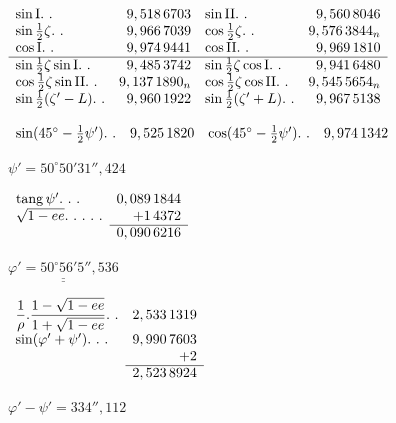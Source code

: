 \noindent\begin{minipage}[t]{.65\linewidth}\vspace{0pt}\centering
\(\begin{array}{lr@{\quad}lr}
\sin\mathrm{I}\ldotp\,\ldotp&9,518\,6703&\sin\mathrm{II}\ldotp\,\ldotp&9,560\,8046\\
\sin\tfrac12\zeta\ldotp\,\ldotp&9,966\,7039&\cos\tfrac12\zeta\ldotp\,\ldotp&9,576\,3844_n\\
\cos\mathrm{I}\ldotp\,\ldotp&9,974\,9441&\cos\mathrm{II}\ldotp\,\ldotp&9,969\,1810\\\hline
\sin\tfrac12\zeta\sin\mathrm{I}\ldotp\,\ldotp&9,485\,3742&\sin\tfrac12\zeta\cos\mathrm{I}\ldotp\,\ldotp&9,941\,6480\\
\cos\tfrac12\zeta\sin\mathrm{II}\ldotp\,\ldotp&9,137\,1890_n&\cos\tfrac12\zeta\cos\mathrm{II}\ldotp\,\ldotp&9,545\,5654_n\\
\sin\tfrac12(\zeta'-L)\ldotp\,\ldotp&9,960\,1922&\sin\tfrac12(\zeta'+L)\ldotp\,\ldotp&9,967\,5138
\end{array}\)
\par\vspace{2.7ex}
\(\begin{array}{lr@{\quad}lr}
\sin(45^\circ-\tfrac12\psi')\ldotp\,\ldotp&9,525\,1820&\cos(45^\circ-\tfrac12\psi')\ldotp\,\ldotp&9,974\,1342
\end{array}\)
\par\smallskip
\(\psi'=50^\circ50'31'',424\)
\par\smallskip
\noindent\begin{minipage}[t]{.45\linewidth}\vspace{0pt}\centering
\(\begin{array}{lr}
\operatorname{tang}\psi'\ldotp\,\ldotp\,\ldotp&0,089\,1844\\
\sqrt{1-ee}\ldotp\,\ldotp\,\ldotp\,\ldotp\,\ldotp&+1\,4372\\\cline{2-2}
&0,090\,6216
\end{array}\)
\par\vspace{3ex}
\(\underline{\underline{\varphi'=50^\circ56'5'',536}}\)
\end{minipage}\hfill
\begin{minipage}[t]{.53\linewidth}\vspace{0pt}\centering
\(\begin{array}{lr}
\displaystyle\frac1\rho.\frac{1-\sqrt{1-ee}}{1+\sqrt{1-ee}}\ldotp\,\ldotp&2,533\,1319\\[1.2ex]
\sin(\varphi'+\psi')\ldotp\,\ldotp\,\ldotp&9,990\,7603\\
&+2\\\cline{2-2}
&2,523\,8924
\end{array}\)
\par\smallskip
\(\varphi'-\psi'=334'',112\)
\end{minipage}
\end{minipage}\hfill
